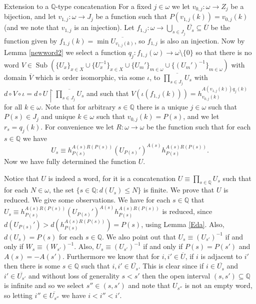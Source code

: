 \documentclass{amsart}
\theoremstyle{definition}\newtheorem{theorem}{Theorem}
\theoremstyle{definition}\newtheorem*{A}{Main Theorem}
\theoremstyle{definition}\newtheorem*{B}{Theorem \ref{elementaryequiv}}
\theoremstyle{definition}\newtheorem*{C}{Theorem \ref{continuous}}
\theoremstyle{definition}\newtheorem*{D}{Theorem \ref{bigisomorphism2}}
\theoremstyle{definition}\newtheorem{bigtheorem}{Main Theorem}
\numberwithin{theorem}{section}
\theoremstyle{definition}\newtheorem{corollary}[theorem]{Corollary}
\theoremstyle{definition}\newtheorem{proposition}[theorem]{Proposition}
\theoremstyle{definition}\newtheorem{definition}[theorem]{Definition}
\theoremstyle{definition}\newtheorem{question}[theorem]{Question}
\theoremstyle{definition}\newtheorem{example}[theorem]{Example}
\theoremstyle{definition}\newtheorem{remark}[theorem]{Remark}
\theoremstyle{definition}\newtheorem{note}[theorem]{Note}
\theoremstyle{definition}\newtheorem{lemma}[theorem]{Lemma}
\theoremstyle{definition}\newtheorem{fact}[theorem]{Fact}
\theoremstyle{definition}\newtheorem{define}[theorem]{Definition}
\theoremstyle{definition}\newtheorem{claim}[theorem]{Claim}
\theoremstyle{definition}\newtheorem{obs}[theorem]{Observation}
\theoremstyle{definition}\newtheorem{definitions}[theorem]{Definitions}
\newcommand{\Sub}{\operatorname{Sub}}
\begin{document}
\begin{section}{Extension to a $\mathbb{Q}$-type concatenation}
For a fixed $j \in \omega$ we let $v_{0, j}: \omega \rightarrow Z_j$ be a bijection, and let $v_{1, j}: \omega \rightarrow J_j$ be a function such that $P(v_{1, j}(k)) = v_{0, j}(k)$ (and we note that $v_{1, j}$ is an injection).  Let $f_{1, j}: \omega \rightarrow \bigcup_{s \in J_j} \overline{U_{s}} \subseteq \overline{U}$ be the function given by $f_{1, j}(k) = \min \overline{U_{v_{1, j}(k)}}$, so $f_{1, j}$ is also an injection.  Now by Lemma \ref{newword2} we select a function $q_j: f_{1, j}(\omega) \rightarrow \omega \setminus \{0\}$ so that there is no word $V \in \Sub(\{U_x\}_{x \in X} \cup \{U_x^{-1}\}_{x \in X} \cup \{U_m'\}_{m \in \omega} \cup \{(U_m')^{-1}\}_{m \in \omega})$ with domain $\overline{V}$ which is order isomorphic, via some $\iota$, to $\overline{\prod_{s \in J_j} U_s}$ with $d \circ V \circ \iota = d \circ U\upharpoonright  \overline{\prod_{s \in J_j} U_s}$ and such that $V(\iota(f_{1, j}(k))) = h_{v_{0, j}(k)}^{A(v_{1, j}(k))q_j(k)}$ for all $k \in \omega$.  Note that for arbitrary $s \in \mathbb{Q}$ there is a unique $j \in \omega$ such that $P(s) \in J_j$ and unique $k \in \omega$ such that $v_{0, j}(k) = P(s)$, and we let $r_s = q_j(k)$.  For convenience we let $R: \omega \rightarrow \omega$ be the function such that for each $s \in \mathbb{Q}$ we have $$U_s \equiv h_{P(s)}^{A(s)R(P(s))}(U_{P(s)}')^{A(s)}h_{P(s)}^{A(s)R(P(s))}.$$Now we have fully determined the function $U$. 

Notice that $U$ is indeed a word, for it is a concatenation $U \equiv \prod_{s \in \mathbb{Q}} U_s$ such that for each $N \in \omega$, the set $\{s \in \mathbb{Q}: d(U_s) \leq N\}$ is finite.  We prove that $U$ is reduced.  We give some observations.  We have for each $s \in \mathbb{Q}$ that $U_s \equiv h_{P(s)}^{A(s)R(P(s))}(U_{P(s)}')^{A(s)}h_{P(s)}^{A(s)R(P(s))}$ is reduced, since $d(U_{P(s)}') > d(h_{P(s)}^{A(s)R(P(s))}) = P(s)$, using Lemma \ref{Eda}.  Also, $d(U_s) = P(s)$ for each $s \in \mathbb{Q}$.  We also point out that $U_s \equiv (U_{s'})^{-1}$ if and only if $W_s \equiv (W_{s'})^{-1}$.  Also, $U_s \equiv (U_{s'})^{-1}$ if and only if $P(s) = P(s')$ and $A(s) = -A(s')$.  Furthermore we know that for $i, i' \in \overline{U}$, if $i$ is adjacent to $i'$ then there is some $s \in \mathbb{Q}$ such that $i, i' \in \overline{U_s}$.  This is clear since if $i \in \overline{U_s}$ and $i' \in \overline{U_{s'}}$ and without loss of generality $s < s'$ then the open interval $(s, s') \subseteq \mathbb{Q}$ is infinite and so we select $s'' \in (s, s')$ and note that $U_{s''}$ is not an empty word, so letting $i'' \in \overline{U_{s''}}$ we have $i < i'' < i'$.


\end{section}
\end{document}

